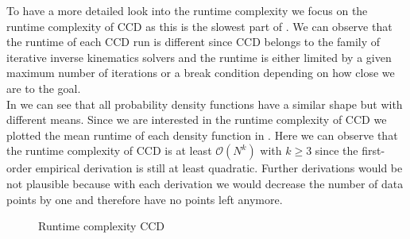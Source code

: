 To have a more detailed look into the runtime complexity we focus on the runtime complexity of CCD as this is the slowest part of . We can observe that the runtime of each CCD run is different since CCD belongs to the family of iterative inverse kinematics solvers and the runtime is either limited by a given maximum number of iterations or a break condition depending on how close we are to the goal. \\
In  we can see that all probability density functions have a similar shape but with different means. Since we are interested in the runtime complexity of CCD we plotted the mean runtime of each density function in . Here we can observe that the runtime complexity of CCD is at least $\mathcal{O}(N^k)$ with $k \geq 3$ since the first-order empirical derivation is still at least quadratic. Further derivations would be not plausible because with each derivation we would decrease the number of data points by one and therefore have no points left anymore.
\begin{figure}
    \begin{center}
        \hfill
    \end{center}
    \caption[Runtime complexity CCD]{Runtime complexity CCD}
    \label{fig:expert_dataset}
\end{figure}

